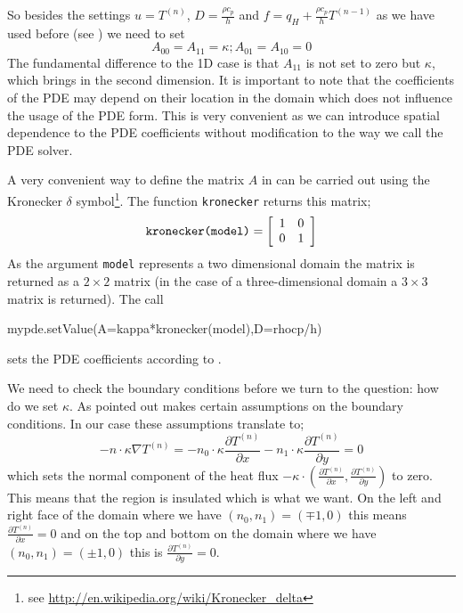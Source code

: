 So besides the settings $u=T^{(n)}$, $D = \frac{\rho c _{p}}{h}$ and
$f = q _{H} + \frac{\rho c_p}{h} T^{(n-1)}$ as we have used
before (see ) we need to set
\begin{equation}\label{eqn: kappa general}
A_{00}=A_{11}=\kappa; A_{01}=A_{10}=0
\end{equation}
The fundamental difference to the 1D case is that $A_{11}$ is not set
to zero but $\kappa$,
which brings in the second dimension. It is important to note that the
coefficients of the PDE may depend on their location in the domain which does
not influence the usage of the PDE form. This is very convenient as we can
introduce spatial dependence to the PDE coefficients without modification to
the way we call the PDE solver. 

A very convenient way to define the matrix $A$ in 
can be carried out using the Kronecker $\delta$ symbol\footnote{see
\url{http://en.wikipedia.org/wiki/Kronecker_delta}}. The 
\esc function \verb|kronecker| returns this matrix;
\begin{equation}
\verb|kronecker(model)| = \left[ 
\begin{array}{cc}
 1 & 0 \\
 0 & 1 \\
\end{array}
\right]
\end{equation}
As the argument \verb|model| represents a two dimensional domain the matrix is
returned as a $2 \times 2$ matrix
(in the case of a three-dimensional domain a $3 \times 3$ matrix is returned).
The call 
\begin{python}
mypde.setValue(A=kappa*kronecker(model),D=rhocp/h)
\end{python}
sets the PDE coefficients according to .  

We need to check the boundary conditions before we turn to the question: how do
we set $\kappa$. As pointed out  makes certain assumptions on
the boundary conditions. In our case these assumptions translate to;
\begin{equation}
-n \cdot \kappa \nabla T^{(n)} = 
-n_{0} \cdot \kappa \frac{\partial T^{(n)}}{\partial x} -
n_{1} \cdot  \kappa \frac{\partial T^{(n)}}{\partial y} = 0
\label{eq:hom flux}
\end{equation}
which sets the normal component of the heat flux $- \kappa \cdot (\frac{\partial
T^{(n)}}{\partial x}, \frac{\partial T^{(n)}}{\partial y})$ to zero. This means
that the region is insulated which is what we want. 
On the left and right face of the domain where we have
$(n_{0},n_{1} ) = (\mp 1,0)$ 
this means $\frac{\partial T^{(n)}}{\partial x}=0$ and on the top and bottom on
the domain 
where we have  $(n_{0},n_{1} ) = (\pm 1,0)$ this is
$\frac{\partial T^{(n)}}{\partial y}=0$. 


